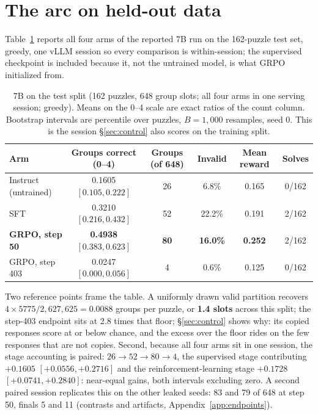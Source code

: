 \documentclass{article}
\begin{document}
\section{The arc on held-out data}
\label{sec:arc}

Table~\ref{tab:arc} reports all four arms of the reported 7B run on the 162-puzzle test set, greedy, one vLLM session so every comparison is within-session; the supervised checkpoint is included because it, not the untrained model, is what GRPO initialized from.

\begin{table}[h]
\centering
\caption{7B on the test split (162 puzzles, 648 group slots; all four arms
in one serving session; greedy). Means on the 0--4 scale are exact ratios of
the count column. Bootstrap intervals are percentile over puzzles,
$B=1{,}000$ resamples, seed 0. This is the session \S\ref{sec:control}
also scores on the training split.}
\label{tab:arc}
\small
\setlength{\tabcolsep}{4pt}
\begin{tabular}{lccccc}
\toprule
Arm & Groups correct (0--4) & Groups (of 648) & Invalid & Mean reward & Solves \\
\midrule
Instruct (untrained) & 0.1605 $[0.105, 0.222]$ & 26 & 6.8\%  & 0.165 & 0/162 \\
SFT                  & 0.3210 $[0.216, 0.432]$ & 52 & 22.2\% & 0.191 & 2/162 \\
\textbf{GRPO, step 50}  & \textbf{0.4938} $[0.383, 0.623]$ & \textbf{80} & \textbf{16.0\%} & \textbf{0.252} & 2/162 \\
GRPO, step 403     & 0.0247 $[0.000, 0.056]$ & 4 & 0.6\%  & 0.125 & 0/162 \\
\bottomrule
\end{tabular}
\end{table}

Two reference points frame the table. A uniformly drawn valid partition
recovers $4 \times 5775/2{,}627{,}625 = 0.0088$ groups per puzzle, or
\textbf{1.4 slots} across this split; the step-403 endpoint sits at 2.8 times that floor; \S\ref{sec:control} shows why: its copied responses score at or below chance, and the excess over the floor rides on the few responses that are not copies. Second, because all four arms sit
in one session, the stage accounting is paired: $26 \rightarrow 52
\rightarrow 80 \rightarrow 4$, the supervised stage contributing $+0.1605$
$[+0.0556, +0.2716]$ and the reinforcement-learning stage $+0.1728$
$[+0.0741, +0.2840]$: near-equal gains, both intervals excluding zero. A second paired session replicates this on the other leaked seeds: 83 and 79 of 648 at step 50, finals 5 and 11 (contrasts and artifacts, Appendix~\ref{app:endpoints}).
\end{document}
